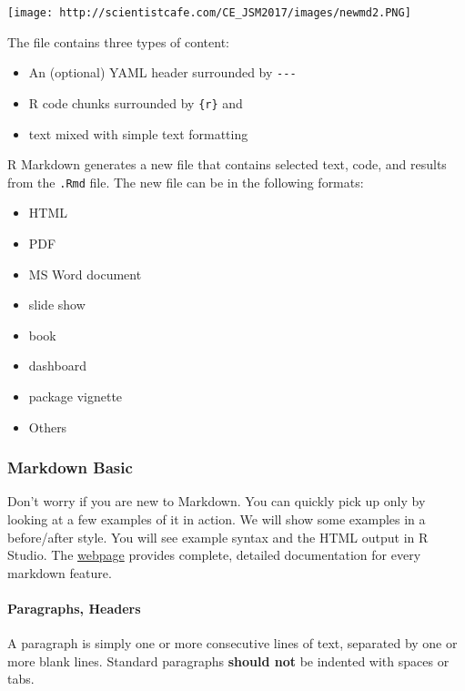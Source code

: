 \documentclass[
]{article}
\providecommand{\tightlist}{%
  \setlength{\itemsep}{0pt}\setlength{\parskip}{0pt}}
\begin{document}
\texttt{[image: http://scientistcafe.com/CE\_JSM2017/images/newmd2.PNG]}

The file contains three types of content:

\begin{itemize}
\tightlist
\item
  An (optional) YAML header surrounded by \texttt{-\/-\/-}
\item
  R code chunks surrounded by
  \texttt{\textasciigrave{}\textasciigrave{}\textasciigrave{}\{r\}} and
  \texttt{\textasciigrave{}\textasciigrave{}\textasciigrave{}}
\item
  text mixed with simple text formatting
\end{itemize}

R Markdown generates a new file that contains selected text, code, and
results from the \texttt{.Rmd} file. The new file can be in the
following formats:

\begin{itemize}
\tightlist
\item
  HTML
\item
  PDF
\item
  MS Word document
\item
  slide show
\item
  book
\item
  dashboard
\item
  package vignette
\item
  Others
\end{itemize}

\hypertarget{markdown-basic}{%
\subsubsection{Markdown Basic}\label{markdown-basic}}

Don't worry if you are new to Markdown. You can quickly pick up only by
looking at a few examples of it in action. We will show some examples in
a before/after style. You will see example syntax and the HTML output in
R Studio. The
\href{https://daringfireball.net/projects/markdown/syntax}{webpage}
provides complete, detailed documentation for every markdown feature.

\hypertarget{paragraphs-headers}{%
\paragraph{Paragraphs, Headers}\label{paragraphs-headers}}

A paragraph is simply one or more consecutive lines of text, separated
by one or more blank lines. Standard paragraphs \textbf{should not} be
indented with spaces or tabs.
\end{document}
